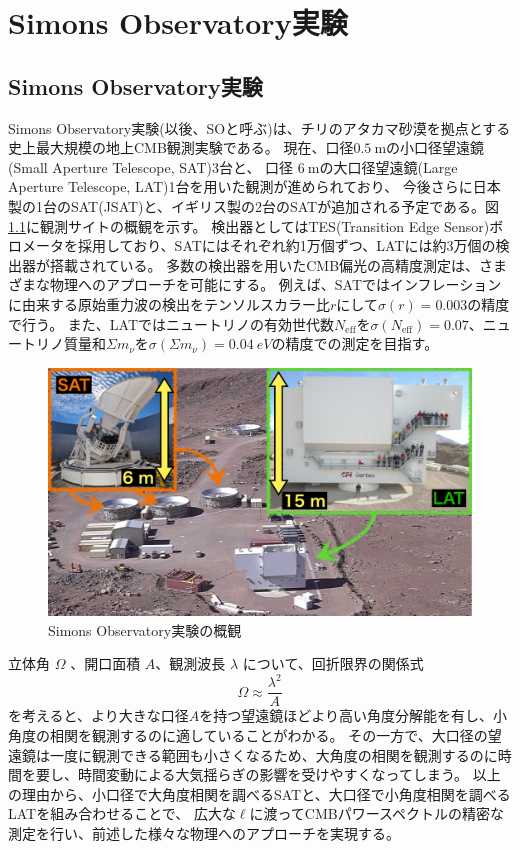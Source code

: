 \documentclass[../../main.tex]{subfiles}
\begin{document}
\chapter{Simons Observatory実験}
\section{Simons Observatory実験}
Simons Observatory実験(以後、SOと呼ぶ)は、チリのアタカマ砂漠を拠点とする史上最大規模の地上CMB観測実験である。
現在、口径$0.5\ \mathrm{m}$の小口径望遠鏡(Small Aperture Telescope, SAT)3台と、
口径 $6\ \mathrm{m}$の大口径望遠鏡(Large Aperture Telescope, LAT)1台を用いた観測が進められており\cite{so:current_status}、
今後さらに日本製の1台のSAT(JSAT)と、イギリス製の2台のSATが追加される予定である。図\ref{fig:so_site}に観測サイトの概観を示す。
検出器としてはTES(Transition Edge Sensor)ボロメータを採用しており、SATにはそれぞれ約1万個ずつ、LATには約3万個の検出器が搭載されている。
多数の検出器を用いたCMB偏光の高精度測定は、さまざまな物理へのアプローチを可能にする。
例えば、SATではインフレーションに由来する原始重力波の検出をテンソルスカラー比$r$にして$\sigma(r)=0.003$の精度で行う。
また、LATではニュートリノの有効世代数$N_\mathrm{eff}$を$\sigma(N_{\mathrm{eff}})=0.07$、ニュートリノ質量和$\Sigma m_\nu$を$\sigma(\Sigma m_\nu)=\SI{0.04}{eV}$の精度での測定を目指す\cite{so:science_forecast}。
\begin{figure}[H]
    \centering
    \includegraphics[width=1.0\textwidth]{simons_observatory/so_site.pdf}
    \caption{Simons Observatory実験の概観}
    \label{fig:so_site}
\end{figure}

立体角 $\Omega$ 、開口面積 $A$、観測波長 $\lambda$ について、回折限界の関係式\cite{denpatenmongaku}
\begin{equation}
    \Omega \approx \dfrac{\lambda^2}{A}
\end{equation}
を考えると、より大きな口径$A$を持つ望遠鏡ほどより高い角度分解能を有し、小角度の相関を観測するのに適していることがわかる。
その一方で、大口径の望遠鏡は一度に観測できる範囲も小さくなるため、大角度の相関を観測するのに時間を要し、時間変動による大気揺らぎの影響を受けやすくなってしまう。
以上の理由から、小口径で大角度相関を調べるSATと、大口径で小角度相関を調べるLATを組み合わせることで、
広大な$\ell$に渡ってCMBパワースペクトルの精密な測定を行い、前述した様々な物理へのアプローチを実現する。
\end{document}
